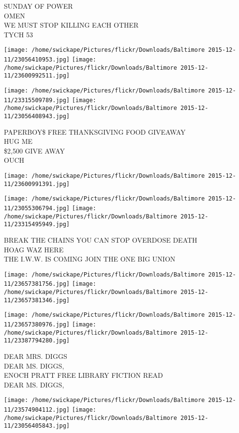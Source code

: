 \documentclass[10pt,letterpaper]{article}
\begin{document}
SUNDAY OF POWER\\
OMEN\\
WE MUST STOP KILLING EACH OTHER\\
TYCH 53
\pagebreak

\texttt{[image: /home/swickape/Pictures/flickr/Downloads/Baltimore 2015-12-11/23056410953.jpg]}
\texttt{[image: /home/swickape/Pictures/flickr/Downloads/Baltimore 2015-12-11/23600992511.jpg]}

\texttt{[image: /home/swickape/Pictures/flickr/Downloads/Baltimore 2015-12-11/23315509789.jpg]}
\texttt{[image: /home/swickape/Pictures/flickr/Downloads/Baltimore 2015-12-11/23056408943.jpg]}

PAPERBOY\$ FREE THANKSGIVING FOOD GIVEAWAY\\
HUG ME\\
\$2,500 GIVE AWAY\\
OUCH
\pagebreak

\texttt{[image: /home/swickape/Pictures/flickr/Downloads/Baltimore 2015-12-11/23600991391.jpg]}

\vspace{0.25in}
\texttt{[image: /home/swickape/Pictures/flickr/Downloads/Baltimore 2015-12-11/23055306794.jpg]}
\texttt{[image: /home/swickape/Pictures/flickr/Downloads/Baltimore 2015-12-11/23315495949.jpg]}

BREAK THE CHAINS YOU CAN STOP OVERDOSE DEATH\\
HOAG WAZ HERE\\
THE I.W.W. IS COMING JOIN THE ONE BIG UNION
\pagebreak

\texttt{[image: /home/swickape/Pictures/flickr/Downloads/Baltimore 2015-12-11/23657381756.jpg]}
\texttt{[image: /home/swickape/Pictures/flickr/Downloads/Baltimore 2015-12-11/23657381346.jpg]}

\texttt{[image: /home/swickape/Pictures/flickr/Downloads/Baltimore 2015-12-11/23657380976.jpg]}
\texttt{[image: /home/swickape/Pictures/flickr/Downloads/Baltimore 2015-12-11/23387794280.jpg]}

DEAR MRS. DIGGS\\
DEAR MS. DIGGS,\\
ENOCH PRATT FREE LIBRARY FICTION READ\\
DEAR MS. DIGGS,
\pagebreak

\texttt{[image: /home/swickape/Pictures/flickr/Downloads/Baltimore 2015-12-11/23574904112.jpg]}
\texttt{[image: /home/swickape/Pictures/flickr/Downloads/Baltimore 2015-12-11/23056405843.jpg]}
\end{document}
